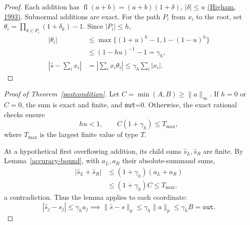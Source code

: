 \documentclass{article}
\begin{document}
\begin{proof}
    Each addition has $\operatorname{fl}(a+b)=(a+b)(1+\delta)$,
    $|\delta|\le u$ \href{https://doi.org/10.1137/0914050}{(Higham, 1993)}.
    Subnormal additions are exact.
    For the path $P_i$ from $x_i$ to the root, set
    $\theta_i=\prod_{k\in P_i}(1+\delta_k)-1$. Since $|P_i|\le h$,
    \begin{align*}
        |\theta_i|
        &\le \max\{(1+u)^h-1,1-(1-u)^h\}\\
        &\le (1-hu)^{-1}-1=\gamma_h,\\
        \left|\widehat{s}-\sum_i x_i\right|
        &=\left|\sum_i x_i\theta_i\right|
        \le\gamma_h\sum_i|x_i|.
    \end{align*}
\end{proof}

\begin{proof}[Proof of Theorem~\ref{postcondition}]
    Let $C=\min(A,B)\ge\|a\|_\infty$.
    If $h=0$ or $C=0$, the sum is exact and finite, and \texttt{out}=0.
    Otherwise, the exact rational checks ensure
    \[
        hu<1,\qquad C(1+\gamma_h)\le T_{\max},
    \]
    where $T_{\max}$ is the largest finite value of type $T$.

    At a hypothetical first overflowing addition, its child sums
    $\widehat{s}_L,\widehat{s}_R$ are finite.
    By Lemma~\ref{accuracy-bound}, with $a_L,a_R$ their absolute-summand sums,
    \begin{align*}
        |\widehat{s}_L+\widehat{s}_R|
        &\le(1+\gamma_h)(a_L+a_R)\\
        &\le(1+\gamma_h)C\le T_{\max},
    \end{align*}
    a contradiction. Thus the lemma applies to each coordinate:
    \[
        |\widehat{s}_j-s_j|\le\gamma_h a_j
        \implies \|\widehat{s}-s\|_p
        \le\gamma_h\|a\|_p\le\gamma_h B=\texttt{out}.
    \]
\end{proof}
\end{document}
